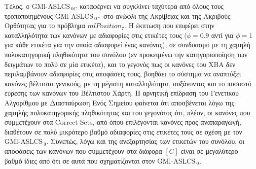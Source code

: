Τέλος, ο GMl-ASLCS$_{\:0C}$ καταφέρνει να συγκλίνει ταχύτερα από όλους τους τροποποιημένους GMl-ASLCS$_{\:0*}$ στο ανώφλι της Ακρίβειας και της Ακριβούς Ορθότητας για το πρόβλημα $mlPosition_{7}$. Η έκπτωση που επιφέρει στην καταλληλότητα των κανόνων με αδιαφορίες στις ετικέτες τους ($\phi=0.9$ αντί για $\phi=1$ για κάθε ετικέτα για την οποία αδιαφορεί ένας κανόνας), σε συνδυασμό με τη χαμηλή πολυκατηγορική πληθικότητα του συνόλου (εν προκειμένω την κατηγοριοποίηση των δειγμάτων το πολύ σε μία ετικέτα), και το γεγονός πως οι κανόνες του ΧΒΑ δεν περιλαμβάνουν αδιαφορίες στις αποφάσεις τους, βοηθάει το σύστημα να αναπτύξει κανόνες βέλτιστα γενικούς, με τη μέγιστη καταλληλότητα, αυξάνοντας και το ποσοστό εύρεσης των κανόνων του Βέλτιστου Χάρτη. Η αρνητική επίδραση του Γενετικού Αλγορίθμου με Διασταύρωση Ενός Σημείου φαίνεται ότι αποσβένεται λόγω της χαμηλής πολυκατηγορικής πληθικότητας και του γεγονότος ότι, πλέον, οι κανόνες που συμμετέχουν στα Correct Sets, από όπου επιλέγονται κανόνες προς αναπαραγωγή, διαθέτουν σε πολύ μικρότερο βαθμό αδιαφορίες στις ετικέτες τους σε σχέση με τον GMl-ASLCS$_{\:0}$. Συνεπώς, λόγω και της ανεξαρτησίας των ετικετών του συνόλου, οι αποφάσεις των κανόνων που συμμετέχουν στα διάφορα $[C]$ είναι σε μεγαλύτερο βαθμό ίδιες από ότι σε αυτά που σχηματίζονται στον GMl-ASLCS$_{\:0}$.













